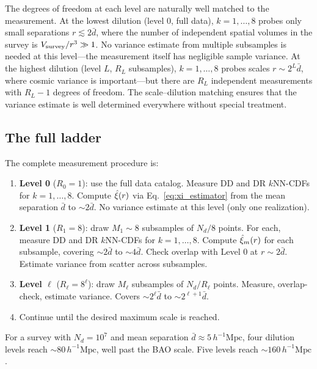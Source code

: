 The degrees of freedom at each level are naturally well matched to the measurement.  At the lowest dilution (level 0, full data), $k = 1, \ldots, 8$ probes only small separations $r \lesssim 2\bar{d}$, where the number of independent spatial volumes in the survey is $V_{\rm survey}/r^3 \gg 1$.  No variance estimate from multiple subsamples is needed at this level---the measurement itself has negligible sample variance.  At the highest dilution (level $L$, $R_L$ subsamples), $k = 1, \ldots, 8$ probes scales $r \sim 2^L \bar{d}$, where cosmic variance is important---but there are $R_L$ independent measurements with $R_L - 1$ degrees of freedom.  The scale--dilution matching ensures that the variance estimate is well determined everywhere without special treatment.

\subsection{The full ladder}
\label{sec:full_ladder}

The complete measurement procedure is:

\begin{enumerate}[nosep]
  \item \textbf{Level 0} ($R_0 = 1$): use the full data catalog.  Measure DD and DR $k$NN-CDFs for $k = 1, \ldots, 8$.  Compute $\hat{\xi}(r)$ via Eq.~\eqref{eq:xi_estimator} from the mean separation $\bar{d}$ to $\sim 2\bar{d}$.  No variance estimate at this level (only one realization).
  \item \textbf{Level 1} ($R_1 = 8$): draw $M_1 \sim 8$ subsamples of $N_d / 8$ points.  For each, measure DD and DR $k$NN-CDFs for $k = 1, \ldots, 8$.  Compute $\hat{\xi}_m(r)$ for each subsample, covering $\sim 2\bar{d}$ to $\sim 4\bar{d}$.  Check overlap with Level 0 at $r \sim 2\bar{d}$.  Estimate variance from scatter across subsamples.
  \item \textbf{Level $\ell$} ($R_\ell = 8^\ell$): draw $M_\ell$ subsamples of $N_d / R_\ell$ points.  Measure, overlap-check, estimate variance.  Covers $\sim 2^\ell \bar{d}$ to $\sim 2^{\ell+1}\bar{d}$.
  \item Continue until the desired maximum scale is reached.
\end{enumerate}

For a survey with $N_d = 10^7$ and mean separation $\bar{d} \approx 5\,h^{-1}\mathrm{Mpc}$, four dilution levels reach $\sim 80\,h^{-1}\mathrm{Mpc}$, well past the BAO scale.  Five levels reach $\sim 160\,h^{-1}\mathrm{Mpc}$.

